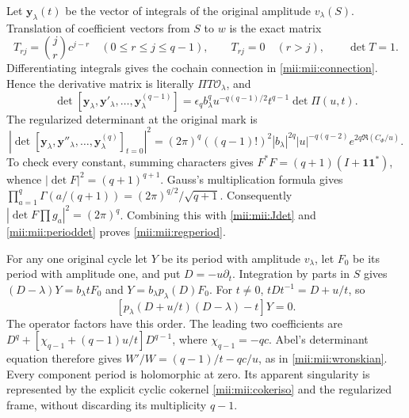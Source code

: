 \documentclass[11pt,a4paper]{article}
\begin{document}
Let $\mathbf y_\lambda(t)$ be the vector of integrals of the
original amplitude $v_\lambda(S)$. Translation of coefficient
vectors from $S$ to $w$ is the exact matrix
\[
 T_{rj}=\binom jr c^{j-r}\quad(0\le r\le j\le q-1),\qquad
 T_{rj}=0\quad(r>j),\qquad\det T=1.
\]
Differentiating integrals gives the cochain connection in
\eqref{mii:mii:connection}. Hence the derivative matrix is literally
$\Pi T\mathcal O_\lambda$, and
\begin{equation}\tag{MII28}\label{mii:mii:wronskian}
 \det[\mathbf y_\lambda,\mathbf y'_\lambda,\ldots,
                       \mathbf y^{(q-1)}_\lambda]
 =\epsilon_q b_\lambda^q u^{-q(q-1)/2}t^{q-1}\det\Pi(u,t).
\end{equation}
The regularized determinant at the original mark is
\begin{equation}\tag{MII29}\label{mii:mii:regperiod}
 \left|\det[\mathbf y_\lambda,\mathbf y''_\lambda,\ldots,
                    \mathbf y_\lambda^{(q)}]_{t=0}\right|^2
 =(2\pi)^q((q-1)!)^2|b_\lambda|^{2q}
     |u|^{-q(q-2)}e^{2q\Re(C_\Phi/u)}.
\end{equation}
To check every constant, summing characters gives
$F^*F=(q+1)(I+\mathbf1\mathbf1^*)$, whence
$|\det F|^2=(q+1)^{q+1}$. Gauss's multiplication formula
\cite[(5.5.6)--(5.5.7)]{mii:dlmf} gives
$\prod_{a=1}^q\Gamma(a/(q+1))=(2\pi)^{q/2}/\sqrt{q+1}$.
Consequently $|\det F\prod g_a|^2=(2\pi)^q$.
Combining this with \eqref{mii:mii:Jdet} and
\eqref{mii:mii:perioddet} proves \eqref{mii:mii:regperiod}.

For any one original cycle let $Y$ be its period with amplitude
$v_\lambda$, let $F_0$ be its period with amplitude one, and
put $D=-u\partial_t$. Integration by parts in $S$ gives
$(D-\lambda)Y=b_\lambda tF_0$ and
$Y=b_\lambda p_\lambda(D)F_0$. For $t\ne0$,
$tDt^{-1}=D+u/t$, so
\begin{equation}\tag{MII30}\label{mii:mii:scalar}
 [p_\lambda(D+u/t)(D-\lambda)-t]Y=0.
\end{equation}
The operator factors have this order. The leading two coefficients
are $D^q+[\chi_{q-1}+(q-1)u/t]D^{q-1}$, where
$\chi_{q-1}=-qc$. Abel's determinant equation therefore gives
$W'/W=(q-1)/t-qc/u$, as in \eqref{mii:mii:wronskian}.
Every component period is holomorphic at zero. Its apparent
singularity is represented by the explicit cyclic cokernel
\eqref{mii:mii:cokeriso} and the regularized frame, without discarding
its multiplicity $q-1$.
\end{document}

